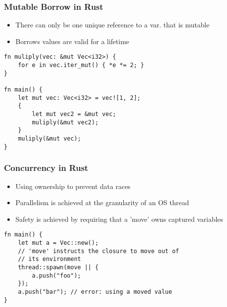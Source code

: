 \documentclass{beamer} %
\begin{document}
\begin{frame}[fragile]
\frametitle{Mutable Borrow in Rust}

\begin{itemize}
    \item There can only be one unique reference to a var. that is mutable
    \item Borrows values are valid for a lifetime
\end{itemize}
    
\begin{lstlisting}
fn muliply(vec: &mut Vec<i32>) {
    for e in vec.iter_mut() { *e *= 2; }
}

fn main() {
    let mut vec: Vec<i32> = vec![1, 2];
    {
        let mut vec2 = &mut vec;
        muliply(&mut vec2);
    }
    muliply(&mut vec);
}
\end{lstlisting}

\end{frame}

\begin{frame}[fragile]
\frametitle{Concurrency in Rust}

\begin{itemize}
    \item Using ownership to prevent data races
    \item Parallelism is achieved at the granularity of an OS thread
    \item Safety is achieved by requiring that a 'move' owns captured variables
\end{itemize}

\begin{lstlisting}
fn main() {
    let mut a = Vec::new();
    // 'move' instructs the closure to move out of 
    // its environment
    thread::spawn(move || {
        a.push("foo");
    });
    a.push("bar"); // error: using a moved value
}
\end{lstlisting}
   
\end{frame}
\end{document}
